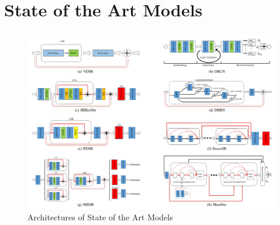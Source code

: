 \section{State of the Art Models}

\begin{figure}[h]
    \centering
    \includegraphics[totalheight=4.4in]{Chapter2/image20.png}
    \caption{Architectures of State of the Art Models \cite{DLSR}}
    \label{fig:test11}
\end{figure}
